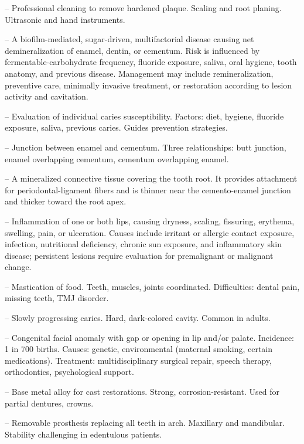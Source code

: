 -- Professional cleaning to remove hardened plaque. Scaling and root planing. Ultrasonic and hand instruments.

-- A biofilm-mediated, sugar-driven, multifactorial disease causing net demineralization of enamel, dentin, or cementum. Risk is influenced by fermentable-carbohydrate frequency, fluoride exposure, saliva, oral hygiene, tooth anatomy, and previous disease. Management may include remineralization, preventive care, minimally invasive treatment, or restoration according to lesion activity and cavitation.

-- Evaluation of individual caries susceptibility. Factors: diet, hygiene, fluoride exposure, saliva, previous caries. Guides prevention strategies.

-- Junction between enamel and cementum. Three relationships: butt junction, enamel overlapping cementum, cementum overlapping enamel.

-- A mineralized connective tissue covering the tooth root. It provides attachment for periodontal-ligament fibers and is thinner near the cemento-enamel junction and thicker toward the root apex.

-- Inflammation of one or both lips, causing dryness, scaling, fissuring, erythema, swelling, pain, or ulceration. Causes include irritant or allergic contact exposure, infection, nutritional deficiency, chronic sun exposure, and inflammatory skin disease; persistent lesions require evaluation for premalignant or malignant change.

-- Mastication of food. Teeth, muscles, joints coordinated. Difficulties: dental pain, missing teeth, TMJ disorder.

-- Slowly progressing caries. Hard, dark-colored cavity. Common in adults.

-- Congenital facial anomaly with gap or opening in lip and/or palate. Incidence: 1 in 700 births. Causes: genetic, environmental (maternal smoking, certain medications). Treatment: multidisciplinary surgical repair, speech therapy, orthodontics, psychological support.

-- Base metal alloy for cast restorations. Strong, corrosion-resistant. Used for partial dentures, crowns.

-- Removable prosthesis replacing all teeth in arch. Maxillary and mandibular. Stability challenging in edentulous patients.

